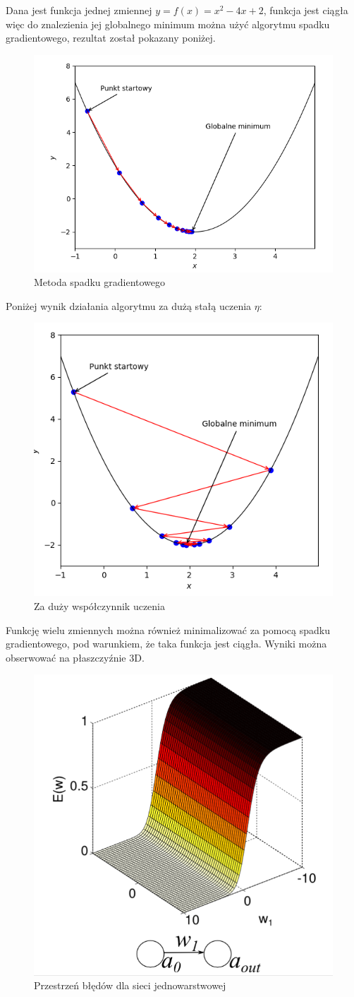 \begin{przyklad}
	Dana jest funkcja jednej zmiennej $ y = f(x) = x^{2} - 4x + 2$, funkcja jest ciągła więc do znalezienia jej globalnego minimum można użyć algorytmu spadku gradientowego, rezultat został pokazany poniżej.
	\begin{figure}[H]
		\centering
		\includegraphics[width=0.5\linewidth]{gradient}
		\caption{Metoda spadku gradientowego}
		\label{fig:gradient}
	\end{figure}

	Poniżej wynik działania algorytmu za dużą stałą uczenia $\eta$:
	\begin{figure}[H]
		\centering
		\includegraphics[width=0.5\linewidth]{gradient_wysoki_eta}
		\caption{Za duży współczynnik uczenia}
		\label{fig:gradientwysokieta}
	\end{figure}
	

\end{przyklad}

\begin{przyklad}
	Funkcję wielu zmiennych można również minimalizować za pomocą spadku gradientowego, pod warunkiem, że taka funkcja jest ciągła. Wyniki można obserwować na płaszczyźnie 3D.
\end{przyklad}

\begin{figure}[H]
	\centering
	\includegraphics[width=0.4\linewidth]{1layererror}
	\caption{Przestrzeń błędów dla sieci jednowarstwowej}
	\label{fig:1layererror}
\end{figure}

